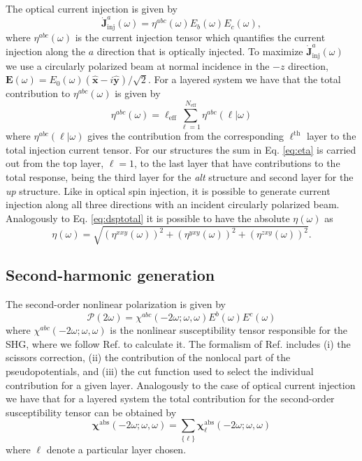 \documentclass[pss]{wiley2sp} %
\begin{document}
The optical current injection is given \cite{arzatePRB14} by
\begin{equation*}
\mathbf{\dot{J}}^{a}_{\text{inj}}(\omega) =
\eta^{abc}(\omega)E_{b}(\omega)E_{c}(\omega), \label{eq:current}
\end{equation*}
where $\eta^{abc}(\omega)$ is the current injection tensor which quantifies
the current injection along the $a$ direction that is optically injected. To
maximize $\mathbf{\dot{J}}^{a}_{\text{inj}}(\omega)$ we use a circularly
polarized beam at normal incidence in the $-z$  direction, $\mathbf{E}(\omega)
= E_{0}(\omega)(\mathbf{\hat{x}} - i\mathbf{\hat{y}})/\sqrt{2}$. For a layered
system we have that the total contribution to $
\eta^{abc}(\omega)$ is given \cite{arzatePRB14} by
\begin{equation}\label{eq:eta}
\eta^{abc}(\omega)=
\ell_{\mathrm{eff}}\sum_{\ell=1}^{N_{\mathrm{eff}}}\eta^{abc}(\ell|\omega)
\end{equation}
where $\eta^{abc}(\ell|\omega)$ gives the contribution from the corresponding
$\ell^{\mathrm{th}}$ layer to the total injection current tensor. For our structures
the sum in Eq. \eqref{eq:eta} is carried out from the top layer, $\ell=1$, to
the last layer that have contributions to the total response, being the third layer
for the \emph{alt} structure and second layer for the \emph{up} structure. Like in
optical spin injection, it is possible to generate current injection along all
three directions with an incident circularly polarized beam. Analogously to Eq.
\eqref{eq:dsptotal} it is possible to have the absolute $\eta(\omega)$
\cite{arzatePRB14} as
\begin{equation}\label{eq:etatotal}
\eta(\omega) =
\sqrt{(\eta^{xxy}(\omega))^{2} +
      (\eta^{yxy}(\omega))^{2} +
      (\eta^{zxy}(\omega))^{2}
      }.
\end{equation}


\subsection{Second-harmonic generation}\label{sec:theory-SHG}
The second-order nonlinear polarization is given \cite{andersonPRB15} by
\begin{equation*}\label{eq:pol}
\mathcal{P}(2\omega) = 
\chi^{abc}(-2\omega;\omega,\omega)E^{b}(\omega)E^{c}(\omega)
\end{equation*} where $\chi^{abc}(-2\omega;\omega,\omega)$ is the nonlinear
susceptibility tensor responsible for the SHG, where we follow Ref.
\cite{andersonPRB15} to calculate it. The 
formalism of Ref. \cite{andersonPRB15} includes (i) the scissors correction,
(ii) the contribution of the nonlocal part of the pseudopotentials, and (iii)
the cut function used to select the individual contribution for a given layer.
Analogously to the case of optical current injection we have that for a layered
system the total contribution for the second-order susceptibility tensor can be
obtained by
\begin{equation}
\boldsymbol{\chi}^{\mathrm{abs}}(-2\omega;\omega,\omega) = 
\sum_{\{\ell\}} \boldsymbol{\chi}^{\mathrm{abs}}_{\ell}(-2\omega;\omega,\omega)
\end{equation}
where $\ell$ denote a particular layer chosen.
\end{document}
